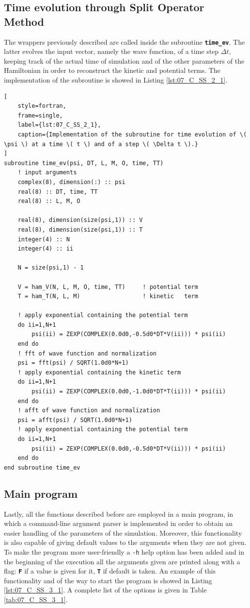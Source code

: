 \documentclass[pra, onecolumn, notitlepage, floats, 11pt]{revtex4-1}
\newcommand{\codebold}[2][cobalt]{\texttt{\bfseries {\color{#1}#2}}}
\newcommand{\code}[2][black]{\color{#1}\texttt{#2}}
\begin{document}
\subsection{Time evolution through Split Operator Method}
The wrappers previously described are called inside the subroutine \codebold[black]{time\_ev}. The latter evolves the input vector, namely the wave function, of a time step \( \Delta t \), keeping track of the actual time of simulation and of the other parameters of the Hamiltonian in order to reconstruct the kinetic and potential terms. The implementation of the subroutine is showed in Listing \ref{lst:07_C_SS_2_1}.

\begin{lstlisting}[
    style=fortran,
    frame=single,
    label={lst:07_C_SS_2_1},
    caption={Implementation of the subroutine for time evolution of \( \psi \) at a time \( t \) and of a step \( \Delta t \).}
]
subroutine time_ev(psi, DT, L, M, O, time, TT)
    ! input arguments
    complex(8), dimension(:) :: psi
    real(8) :: DT, time, TT
    real(8) :: L, M, O

    real(8), dimension(size(psi,1)) :: V
    real(8), dimension(size(psi,1)) :: T
    integer(4) :: N
    integer(4) :: ii

    N = size(psi,1) - 1

    V = ham_V(N, L, M, O, time, TT)     ! potential term
    T = ham_T(N, L, M)                  ! kinetic   term

    ! apply exponential containing the potential term
    do ii=1,N+1
        psi(ii) = ZEXP(COMPLEX(0.0d0,-0.5d0*DT*V(ii))) * psi(ii)
    end do
    ! fft of wave function and normalization
    psi = fft(psi) / SQRT(1.0d0*N+1)
    ! apply exponential containing the kinetic term
    do ii=1,N+1
        psi(ii) = ZEXP(COMPLEX(0.0d0,-1.0d0*DT*T(ii))) * psi(ii)
    end do
    ! afft of wave function and normalization
    psi = afft(psi) / SQRT(1.0d0*N+1)
    ! apply exponential containing the potential term
    do ii=1,N+1
        psi(ii) = ZEXP(COMPLEX(0.0d0,-0.5d0*DT*V(ii))) * psi(ii)
    end do
end subroutine time_ev
\end{lstlisting}



\subsection{Main program}
Lastly, all the functions described before are employed in a main program, in which a command-line argument parser is implemented in order to obtain an easier handling of the parameters of the simulation. Moreover, this functionality is also capable of giving default values to the arguments when they are not given.
To make the program more user-friendly a \code{-h} help option has been added and in the beginning of the execution all the arguments given are printed along with a flag: \codebold[red]{F} if a value is given for it, \codebold[dartmouthgreen]{T} if default is taken. An example of this functionality and of the way to start the program is showed in Listing \ref{lst:07_C_SS_3_1}. A complete list of the options is given in Table \ref{tab:07_C_SS_3_1}.
\end{document}
